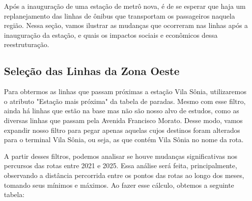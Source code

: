 Após a inauguração de uma estação de metrô nova, é de se esperar que haja um replanejamento das linhas de ônibus que transportam os passageiros naquela região. Nessa seção, vamos ilustrar as mudanças que ocorreram nas linhas após a inauguração da estação, e quais os impactos sociais e econômicos dessa reestruturação. 

\subsection{Seleção das Linhas da Zona Oeste}
Para obtermos as linhas que passam próximas a estação Vila Sônia, utilizaremos o atributo "Estação mais próxima" da tabela de paradas. Mesmo com esse filtro, ainda há linhas que estão na base mas não são nosso alvo de estudos, como as diversas linhas que passam pela Avenida Francisco Morato. Desse modo, vamos expandir nosso filtro para pegar apenas aquelas cujos destinos foram alterados para o terminal Vila Sônia, ou seja, as que contém Vila Sônia no nome da rota.

A partir desses filtros, podemos analisar se houve mudanças significativas nos percursos das rotas entre 2021 e 2025. Essa análise será feita, principalmente, observando a distância percorrida entre os pontos das rotas ao longo dos meses, tomando seus mínimos e máximos. Ao fazer esse cálculo, obtemos a seguinte tabela:

